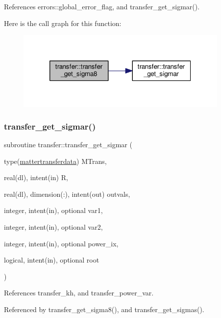 References errors\+::global\+\_\+error\+\_\+flag, and transfer\+\_\+get\+\_\+sigmar().

Here is the call graph for this function\+:
\nopagebreak
\begin{figure}[H]
\begin{center}
\leavevmode
\includegraphics[width=296pt]{namespacetransfer_a6330289a440bd51a5c55da9c40dee8a2_cgraph}
\end{center}
\end{figure}
\mbox{\label{namespacetransfer_a0b068265a029b16713e45ff26d8e6794}} 
\subsubsection{\texorpdfstring{transfer\+\_\+get\+\_\+sigmar()}{transfer\_get\_sigmar()}}
{\footnotesize\ttfamily subroutine transfer\+::transfer\+\_\+get\+\_\+sigmar (\begin{DoxyParamCaption}\item[{type(\mbox{\hyperlink{structtransfer_1_1mattertransferdata}{mattertransferdata}})}]{M\+Trans,  }\item[{real(dl), intent(in)}]{R,  }\item[{real(dl), dimension(\+:), intent(out)}]{outvals,  }\item[{integer, intent(in), optional}]{var1,  }\item[{integer, intent(in), optional}]{var2,  }\item[{integer, intent(in), optional}]{power\+\_\+ix,  }\item[{logical, intent(in), optional}]{root }\end{DoxyParamCaption})}



References transfer\+\_\+kh, and transfer\+\_\+power\+\_\+var.



Referenced by transfer\+\_\+get\+\_\+sigma8(), and transfer\+\_\+get\+\_\+sigmas().

